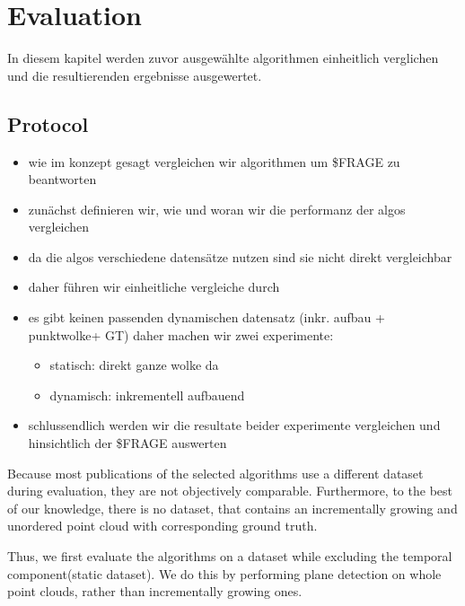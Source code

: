 \documentclass[main.tex]{subfiles}
\begin{document}
\chapter{Evaluation}

In diesem kapitel werden zuvor ausgewählte algorithmen einheitlich verglichen und die resultierenden ergebnisse ausgewertet.

\section{Protocol}

\begin{itemize}
    \item wie im konzept gesagt vergleichen wir algorithmen um \$FRAGE zu beantworten
    \item zunächst definieren wir, wie und woran wir die performanz der algos vergleichen
    \item da die algos verschiedene datensätze nutzen sind sie nicht direkt vergleichbar
    \item daher führen wir einheitliche vergleiche durch
    \item es gibt keinen passenden dynamischen datensatz (inkr. aufbau + punktwolke+ GT) daher machen wir zwei experimente:
    \begin{itemize}
        \item statisch: direkt ganze wolke da
        \item dynamisch: inkrementell aufbauend
    \end{itemize}
    \item schlussendlich werden wir die resultate beider experimente vergleichen und hinsichtlich der \$FRAGE auswerten
\end{itemize}


Because most publications of the selected algorithms use a different dataset during evaluation, they are not objectively comparable.
Furthermore, to the best of our knowledge, there is no dataset, that contains an incrementally growing and unordered point cloud with corresponding ground truth.

Thus, we first evaluate the algorithms on a dataset while excluding the temporal component(static dataset). We do this by performing plane detection on whole point clouds, rather than
incrementally growing ones. 
\end{document}
